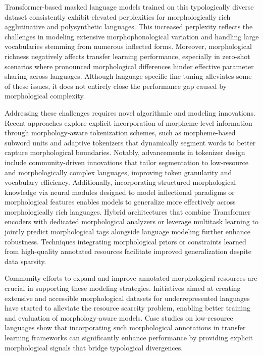 \documentclass[sigconf]{acmart}
\begin{document}
Transformer-based masked language models trained on this typologically diverse dataset consistently exhibit elevated perplexities for morphologically rich agglutinative and polysynthetic languages. This increased perplexity reflects the challenges in modeling extensive morphophonological variation and handling large vocabularies stemming from numerous inflected forms. Moreover, morphological richness negatively affects transfer learning performance, especially in zero-shot scenarios where pronounced morphological differences hinder effective parameter sharing across languages. Although language-specific fine-tuning alleviates some of these issues, it does not entirely close the performance gap caused by morphological complexity.

Addressing these challenges requires novel algorithmic and modeling innovations. Recent approaches explore explicit incorporation of morpheme-level information through morphology-aware tokenization schemes, such as morpheme-based subword units and adaptive tokenizers that dynamically segment words to better capture morphological boundaries. Notably, advancements in tokenizer design include community-driven innovations that tailor segmentation to low-resource and morphologically complex languages, improving token granularity and vocabulary efficiency. Additionally, incorporating structured morphological knowledge via neural modules designed to model inflectional paradigms or morphological features enables models to generalize more effectively across morphologically rich languages. Hybrid architectures that combine Transformer encoders with dedicated morphological analyzers or leverage multitask learning to jointly predict morphological tags alongside language modeling further enhance robustness. Techniques integrating morphological priors or constraints learned from high-quality annotated resources facilitate improved generalization despite data sparsity.

Community efforts to expand and improve annotated morphological resources are crucial in supporting these modeling strategies. Initiatives aimed at creating extensive and accessible morphological datasets for underrepresented languages have started to alleviate the resource scarcity problem, enabling better training and evaluation of morphology-aware models. Case studies on low-resource languages show that incorporating such morphological annotations in transfer learning frameworks can significantly enhance performance by providing explicit morphological signals that bridge typological divergences.
\end{document}
